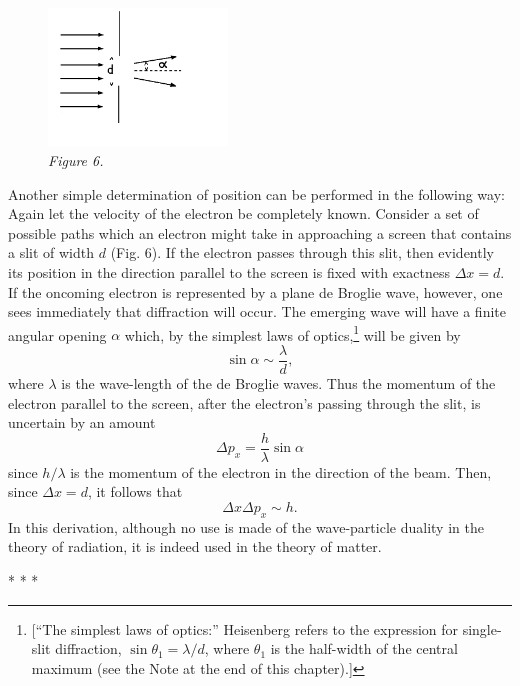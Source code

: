 %
\begin{figure}[h] %
  \begin{center}
    \includegraphics[width=1.875in,height=1.4414in]{images/10_heisenberg/image021.png}
  \end{center}
  \caption*{\emph{Figure 6.}\footnotemark}
\end{figure}
%

Another simple determination of position can be performed in the
following way: Again let the velocity of the electron be completely
known. Consider a set of possible paths which an electron might take in
approaching a screen that contains a slit of
width $d$ (Fig. 6). If the electron passes through this slit, then evidently
its position in the direction parallel to the screen is fixed with
exactness $\Delta x = d$. If the oncoming electron is represented
by a plane de Broglie wave, however, one sees immediately that
diffraction will occur. The emerging wave will have a finite angular
opening $\alpha$ which, by the simplest laws of optics,\footnote{{[}``The
  simplest laws of optics:'' Heisenberg refers to the expression for
  single-slit diffraction, $\sin \theta_1 = \lambda/d$,
  where $\theta_1$ is the half-width of the central maximum (see the Note
  at the end of this chapter).{]}} will be given by
%
\begin{equation*}\tag{19}
\sin \alpha \sim \frac{\lambda}{d} , %
\end{equation*}
%
where \emph{$\lambda$} is the wave-length of the de Broglie waves. Thus the
momentum of the electron parallel to the screen, after the electron's
passing through the slit, is uncertain by an amount
%
\begin{equation*}\tag{20}
\Delta p_x = \frac{h}{\lambda}\sin \alpha %
\end{equation*}
%
since $h/\lambda$ is the momentum of the electron in the direction of the
beam. Then, since $\Delta x = d$, it follows that
%
\begin{equation*}
\Delta x \Delta p_x \sim h.
\end{equation*}
%
In this derivation, although no use is made of the wave-particle duality
in the theory of radiation, it is indeed used in the theory of matter.\\
\centerline{* * *}
%
